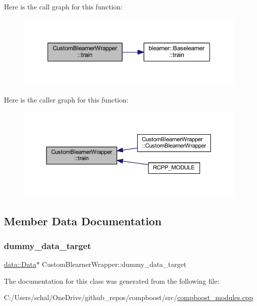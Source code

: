 Here is the call graph for this function\+:\nopagebreak
\begin{figure}[H]
\begin{center}
\leavevmode
\includegraphics[width=348pt]{class_custom_blearner_wrapper_a970f89e16f5dc5cfce1e1dc4461d34a5_cgraph}
\end{center}
\end{figure}
Here is the caller graph for this function\+:\nopagebreak
\begin{figure}[H]
\begin{center}
\leavevmode
\includegraphics[width=350pt]{class_custom_blearner_wrapper_a970f89e16f5dc5cfce1e1dc4461d34a5_icgraph}
\end{center}
\end{figure}


\subsection{Member Data Documentation}
\mbox{\label{class_custom_blearner_wrapper_af70b599670b5c64406e10b7bda9c0bb1}} 
\subsubsection{\texorpdfstring{dummy\+\_\+data\+\_\+target}{dummy\_data\_target}}
{\footnotesize\ttfamily \mbox{\hyperlink{classdata_1_1_data}{data\+::\+Data}}$\ast$ Custom\+Blearner\+Wrapper\+::dummy\+\_\+data\+\_\+target\hspace{0.3cm}{\ttfamily [private]}}



The documentation for this class was generated from the following file\+:\begin{DoxyCompactItemize}
\item 
C\+:/\+Users/schal/\+One\+Drive/github\+\_\+repos/compboost/src/\mbox{\hyperlink{compboost__modules_8cpp}{compboost\+\_\+modules.\+cpp}}\end{DoxyCompactItemize}
